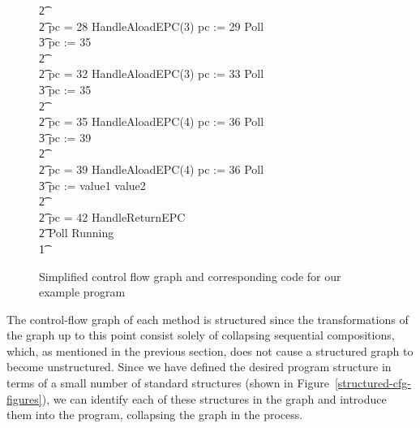\begin{figure}
\begin{center}
\begin{minipage}{0.6\linewidth}
\begin{circus}
        \t2 {} \cdots {} \\
        \t2 {} \circelse pc = 28 \circthen HandleAloadEPC(3) \circseq pc := 29 \circseq Poll \circseq \cdots \circseq \\
        \t3 pc := 35 \\
        \t2 {} \cdots {} \\
        \t2 {} \circelse pc = 32 \circthen HandleAloadEPC(3) \circseq pc := 33 \circseq Poll \circseq \cdots \circseq \\
        \t3 pc := 35 \\
        \t2 {} \cdots {} \\
        \t2 {} \circelse pc = 35 \circthen HandleAloadEPC(4) \circseq pc := 36 \circseq Poll \circseq \cdots \circseq \\
        \t3 pc := 39 \\
        \t2 {} \cdots {} \\
        \t2 {} \circelse pc = 39 \circthen HandleAloadEPC(4) \circseq pc := 36 \circseq Poll \circseq \cdots \circseq \\
        \t3 pc := \IF value1 \leq value2   \\
        \t2 {} \cdots {} \\
        \t2 {} \circelse pc = 42 \circthen HandleReturnEPC \\
        \t2 \circfi \circseq Poll \circseq Running \\
        \t1 \circfi
      \end{circus}
    \end{minipage}
  \end{center}
  \caption{Simplified control flow graph and corresponding code for our example
    program}
  \label{example-simplified-control-flow-graph-figure}
\end{figure}


The control-flow graph of each method is structured since the
transformations of the graph up to this point consist solely of
collapsing sequential compositions, which, as mentioned in the
previous section, does not cause a structured graph to become
unstructured.
Since we have defined the desired program structure in terms of a
small number of standard structures (shown in
Figure~\ref{structured-cfg-figures}), we can identify each of these
structures in the graph and introduce them into the program,
collapsing the graph in the process.

